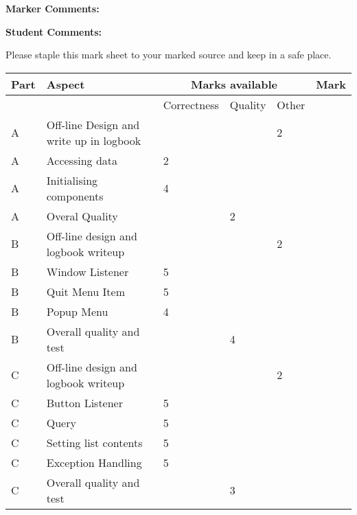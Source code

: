 \newcommand{\MaximumMarks}{100}

\Large
\vspace{0.5in}
\textbf{Marker Comments:}
\vspace{1.5in}

\textbf{Student Comments:}
\vspace{1.5in}

\normalsize
Please staple this mark sheet to your marked source and keep
in a safe place.

\newpage

\begin{longtable}{|l|l|l|l|l|l|}
\hline
Part & Aspect & \multicolumn{3}{|c|}{Marks available} & Mark\\ \hline
     && Correctness & Quality & Other & \\
\hline\hline
A    & Off-line Design and write up in logbook & & & 2 &\\ \hline
A    & Accessing data & 2 & &  &\\ \hline
A    & Initialising components & 4 & &  &\\ \hline
A    & Overal Quality & & 2 &  &\\
\hline
\hline\hline

B    & Off-line design and logbook writeup &   &  & 2 &\\ \hline
B    & Window Listener & 5 &   &   &\\ \hline
B    & Quit Menu Item & 5 &   &   &\\ \hline
B    & Popup Menu & 4 & &   &\\ \hline
B    & Overall quality and test    &   & 4 &   &\\
\hline
\hline\hline

C    & Off-line design and logbook writeup &   &  & 2  &\\ \hline
C    & Button Listener & 5 &   &   &\\ \hline
C    & Query & 5 &   &   &\\ \hline
C    & Setting list contents & 5 &   &   &\\ \hline
C    & Exception Handling  & 5  &   &   &\\ \hline
C    & Overall quality and test & & 3 &   &\\
\hline
\hline\hline


\end{longtable}
